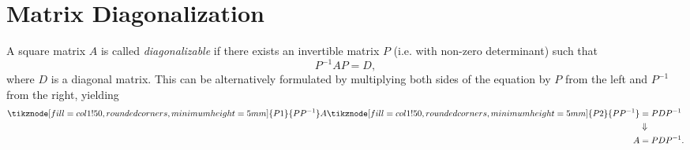 \section{Matrix Diagonalization}
A square matrix $A$ is called \emph{diagonalizable} if there exists an invertible matrix $P$ (i.e. with non-zero determinant) such that
\begin{equation*}
  P^{-1}AP = D,
\end{equation*}
where $D$ is a diagonal matrix. This can be alternatively formulated by multiplying both sides of the equation by $P$ from the left and $P^{-1}$ from the right, yielding
\begin{align*}
  \tikznode[fill=col1!50, rounded corners,	minimum height=5mm]{P1}{PP^{-1}}A\tikznode[fill=col1!50, rounded corners,  minimum height=5mm]{P2}{PP^{-1}} &= PDP^{-1}\\
  &\Downarrow\\
  A &= PDP^{-1}.
\end{align*}

